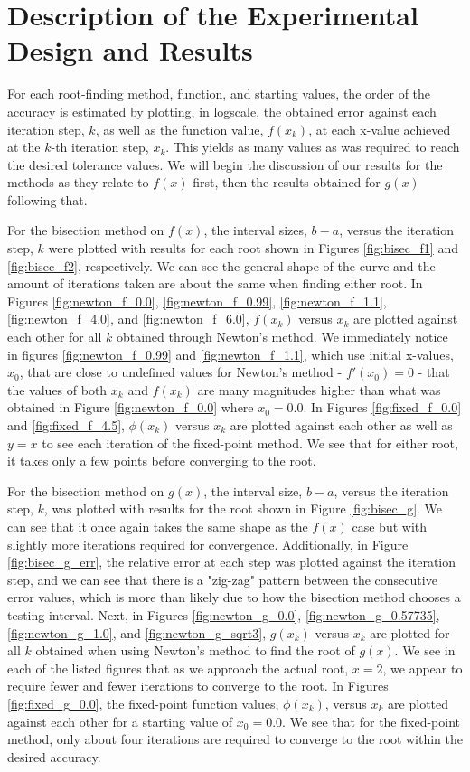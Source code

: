 \documentclass[11pt]{article}
\begin{document}
\section{Description of the Experimental Design and Results}

For each root-finding method, function, and starting values, the order of the accuracy is estimated by plotting, in logscale, the obtained error against each iteration step, $k$, as well as the function value, $f(x_k)$, at each x-value achieved at the $k$-th iteration step,  $x_k$. This yields as many values as was required to reach the desired tolerance values. We will begin the discussion of our results for the methods as they relate to $f(x)$ first, then the results obtained for $g(x)$ following that.

For the bisection method on $f(x)$, the interval sizes, $b - a$, versus the iteration step, $k$ were plotted with results for each root shown in Figures \ref{fig:bisec_f1} and  \ref{fig:bisec_f2}, respectively. We can see the general shape of the curve and the amount of iterations taken are about the same when finding either root. In Figures \ref{fig:newton_f_0.0}, \ref{fig:newton_f_0.99}, \ref{fig:newton_f_1.1}, \ref{fig:newton_f_4.0}, and \ref{fig:newton_f_6.0}, $f(x_k)$ versus $x_k$ are plotted against each other for all $k$ obtained through Newton's method. We immediately notice in figures \ref{fig:newton_f_0.99} and \ref{fig:newton_f_1.1}, which use initial x-values, $x_0$, that are close to undefined values for Newton's method - $f'(x_0) = 0$ - that the values of both $x_k$ and $f(x_k)$ are many magnitudes higher than what was obtained in Figure \ref{fig:newton_f_0.0} where $x_0 = 0.0$. In Figures \ref{fig:fixed_f_0.0} and \ref{fig:fixed_f_4.5}, $\phi(x_k)$ versus $x_k$ are plotted against each other as well as $y=x$ to see each iteration of the fixed-point method. We see that for either root, it takes only a few points before converging to the root.

For the bisection method on $g(x)$, the interval size, $b-a$, versus the iteration step, $k$, was plotted with results for the root shown in Figure \ref{fig:bisec_g}. We can see that it once again takes the same shape as the $f(x)$ case but with slightly more iterations required for convergence. Additionally, in Figure \ref{fig:bisec_g_err}, the relative error at each step was plotted against the iteration step, and we can see that there is a "zig-zag" pattern between the consecutive error values, which is more than likely due to how the bisection method chooses a testing interval. Next, in Figures \ref{fig:newton_g_0.0}, \ref{fig:newton_g_0.57735}, \ref{fig:newton_g_1.0}, and \ref{fig:newton_g_sqrt3}, $g(x_k)$ versus $x_k$ are plotted for all $k$ obtained when using Newton's method to find the root of $g(x)$. We see in each of the listed figures that as we approach the actual root, $x = 2$, we appear to require fewer and fewer iterations to converge to the root. In Figures \ref{fig:fixed_g_0.0}, the fixed-point function values, $\phi(x_k)$, versus $x_k$ are plotted against each other for a starting value of $x_0 = 0.0$. We see that for the fixed-point method, only about four iterations are required to converge to the root within the desired accuracy.
\end{document}
